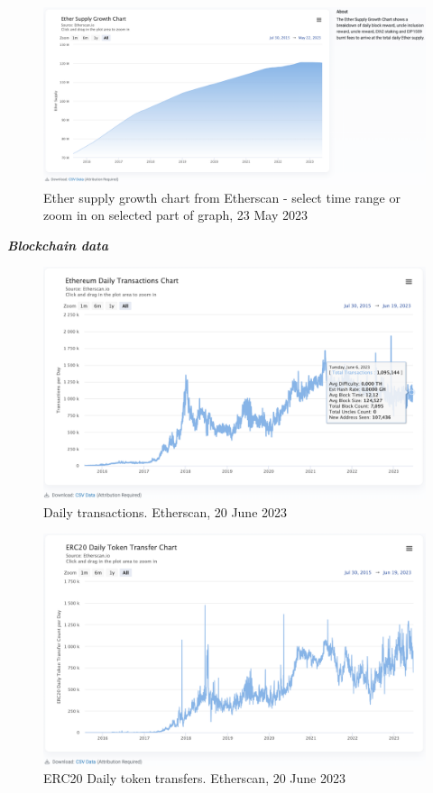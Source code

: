 \documentclass[UTF8]{article}
\begin{document}
\begin{figure}[htbp]
\begin{center}
\includegraphics[width=0.9\linewidth]{images/ethgrowth}
\caption{Ether supply growth chart from Etherscan - select time range or zoom in on selected part of graph, 23 May 2023}
\label{fig:ethgrowth}
\end{center}
\end{figure}

\clearpage

\textit{\textbf{Blockchain data}}
\begin{figure}[htbp]
\begin{center}
\includegraphics[width=0.9\linewidth]{images/ethdailytxns}
\caption{Daily transactions. Etherscan, 20 June 2023}
\label{fig:ethdailytxns}
\end{center}
\end{figure}

\begin{figure}[htbp]
\begin{center}
\includegraphics[width=0.9\linewidth]{images/ethdailyerc20}
\caption{ERC20 Daily token transfers. Etherscan, 20 June 2023}
\label{fig:ethdailyerc20}
\end{center}
\end{figure}
\end{document}
